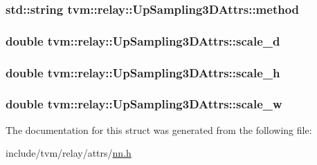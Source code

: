 \subsubsection[{\texorpdfstring{method}{method}}]{\setlength{\rightskip}{0pt plus 5cm}std\+::string tvm\+::relay\+::\+Up\+Sampling3\+D\+Attrs\+::method}\hypertarget{structtvm_1_1relay_1_1UpSampling3DAttrs_a86334960861ecfd8dbd6cc61631b4647}{}\label{structtvm_1_1relay_1_1UpSampling3DAttrs_a86334960861ecfd8dbd6cc61631b4647}
\subsubsection[{\texorpdfstring{scale\+\_\+d}{scale_d}}]{\setlength{\rightskip}{0pt plus 5cm}double tvm\+::relay\+::\+Up\+Sampling3\+D\+Attrs\+::scale\+\_\+d}\hypertarget{structtvm_1_1relay_1_1UpSampling3DAttrs_a73f52d511b9d564724930bc40497cee7}{}\label{structtvm_1_1relay_1_1UpSampling3DAttrs_a73f52d511b9d564724930bc40497cee7}
\subsubsection[{\texorpdfstring{scale\+\_\+h}{scale_h}}]{\setlength{\rightskip}{0pt plus 5cm}double tvm\+::relay\+::\+Up\+Sampling3\+D\+Attrs\+::scale\+\_\+h}\hypertarget{structtvm_1_1relay_1_1UpSampling3DAttrs_a8ce387249c84609450b32fd69d719366}{}\label{structtvm_1_1relay_1_1UpSampling3DAttrs_a8ce387249c84609450b32fd69d719366}
\subsubsection[{\texorpdfstring{scale\+\_\+w}{scale_w}}]{\setlength{\rightskip}{0pt plus 5cm}double tvm\+::relay\+::\+Up\+Sampling3\+D\+Attrs\+::scale\+\_\+w}\hypertarget{structtvm_1_1relay_1_1UpSampling3DAttrs_a270613b4109d2b24766b7bfbac2539c1}{}\label{structtvm_1_1relay_1_1UpSampling3DAttrs_a270613b4109d2b24766b7bfbac2539c1}


The documentation for this struct was generated from the following file\+:\begin{DoxyCompactItemize}
\item 
include/tvm/relay/attrs/\hyperlink{include_2tvm_2relay_2attrs_2nn_8h}{nn.\+h}\end{DoxyCompactItemize}

